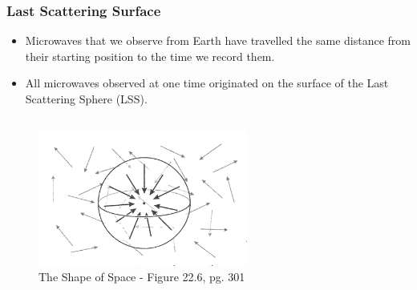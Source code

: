 \documentclass[13pt]{beamer}
\begin{document}
\begin{frame}
\frametitle{Last Scattering Surface}
  \begin{itemize}
    \item Microwaves that we observe from Earth have travelled the same distance from their starting position to the time we record them.
    \item All microwaves observed at one time originated on the surface of the \alert{Last Scattering Sphere (LSS)}.
  \end{itemize}

  \begin{columns}[c] %
     \centering
      \begin{figure}
        \includegraphics[height=4.5cm]{./img/scattering} %
        \caption{The Shape of Space - Figure 22.6, pg. 301}
      \end{figure}
  \end{columns}
\end{frame}
\end{document}
